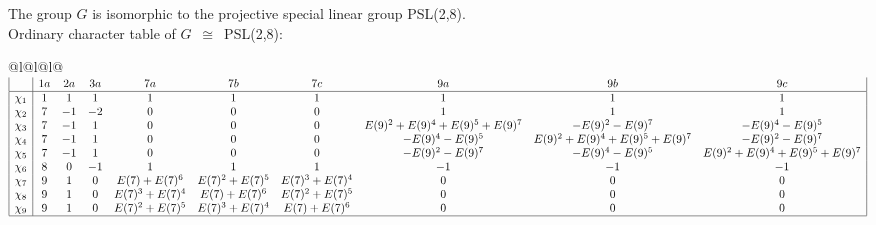 \documentclass[varwidth=\maxdimen,border=10]{standalone}
\begin{document}
The group $G$ is isomorphic to the projective special linear group PSL(2,8).\\
Ordinary character table of $G$\ $\cong$\ PSL(2,8):\\
\begin{center}
\begin{tabular}{@{}l@{}l@{}l@{}}
\hline
\(\begin{array}{|l|ccccccccc|}
  & 1a & 2a & 3a & 7a & 7b & 7c & 9a & 9b & 9c\\ \hline
\chi_{1} & 1 & 1 & 1 & 1 & 1 & 1 & 1 & 1 & 1\\
\chi_{2} & 7 & -1 & -2 & 0 & 0 & 0 & 1 & 1 & 1\\
\chi_{3} & 7 & -1 & 1 & 0 & 0 & 0 & E(9)^{2}+E(9)^{4}+E(9)^{5}+E(9)^{7} & -E(9)^{2}-E(9)^{7} & -E(9)^{4}-E(9)^{5}\\
\chi_{4} & 7 & -1 & 1 & 0 & 0 & 0 & -E(9)^{4}-E(9)^{5} & E(9)^{2}+E(9)^{4}+E(9)^{5}+E(9)^{7} & -E(9)^{2}-E(9)^{7}\\
\chi_{5} & 7 & -1 & 1 & 0 & 0 & 0 & -E(9)^{2}-E(9)^{7} & -E(9)^{4}-E(9)^{5} & E(9)^{2}+E(9)^{4}+E(9)^{5}+E(9)^{7}\\
\chi_{6} & 8 & 0 & -1 & 1 & 1 & 1 & -1 & -1 & -1\\
\chi_{7} & 9 & 1 & 0 & E(7)+E(7)^{6} & E(7)^{2}+E(7)^{5} & E(7)^{3}+E(7)^{4} & 0 & 0 & 0\\
\chi_{8} & 9 & 1 & 0 & E(7)^{3}+E(7)^{4} & E(7)+E(7)^{6} & E(7)^{2}+E(7)^{5} & 0 & 0 & 0\\
\chi_{9} & 9 & 1 & 0 & E(7)^{2}+E(7)^{5} & E(7)^{3}+E(7)^{4} & E(7)+E(7)^{6} & 0 & 0 & 0\\
\hline
\end{array}\)\\
\end{tabular}
\end{center}
\end{document}
